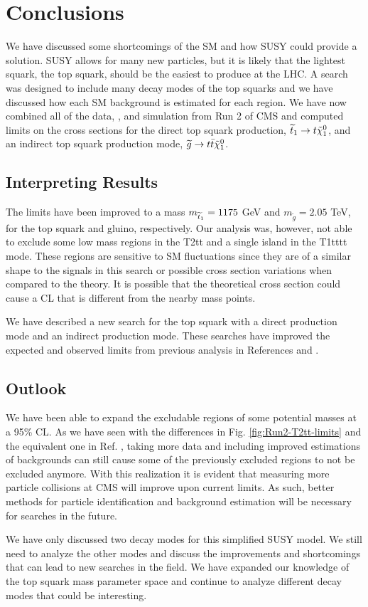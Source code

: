 \chapter{Conclusions}
\label{ch:Conclusions}

We have discussed some shortcomings of the SM and how SUSY could provide a solution. SUSY allows for many new particles, but it is likely that the lightest squark, the top squark, should be the easiest to produce at the LHC. A search was designed to include many decay modes of the top squarks and we have discussed how each SM background is estimated for each region. We have now combined all of the data, \datalumi{}, and simulation from Run 2 of CMS and computed limits on the cross sections for the direct top squark production, $\widetilde{t}_1\rightarrow t\tilde{\chi}^{0}_{1}$, and an indirect top squark production mode, $\widetilde{g}\rightarrow t \bar{t}\tilde{\chi}^{0}_{1}$. 

\section{Interpreting Results}
\label{sec:Interp}

The limits have been improved to a mass $m_{\widetilde{t}_1}=1175$ GeV and $m_{\widetilde{g}}=2.05$ TeV, for the top squark and gluino, respectively. Our analysis was, however, not able to exclude some low mass regions in the T2tt and a single island in the T1tttt mode. These regions are sensitive to SM fluctuations since they are of a similar shape to the signals in this search or possible cross section variations when compared to the theory. It is possible that the theoretical cross section could cause a CL that is different from the nearby mass points. 

We have described a new search for the top squark with a direct production mode and an indirect production mode. These searches have improved the expected and observed limits from previous analysis in References \cite{sirunyan_search_2017} and \cite{cms_collaboration_search_2018}. 

\section{Outlook}	
\label{sec:outlook}

We have been able to expand the excludable regions of some potential masses at a 95\% CL. As we have seen with the differences in Fig. \ref{fig:Run2-T2tt-limits} and the equivalent one in Ref. \cite{sirunyan_search_2017}, taking more data and including improved estimations of backgrounds can still cause some of the previously excluded regions to not be excluded anymore. With this realization it is evident that measuring more particle collisions at CMS will improve upon current limits. As such, better methods for particle identification and background estimation will be necessary for searches in the future. 

We have only discussed two decay modes for this simplified SUSY model. We still need to analyze the other modes and discuss the improvements and shortcomings that can lead to new searches in the field. We have expanded our knowledge of the top squark mass parameter space and continue to analyze different decay modes that could be interesting.
